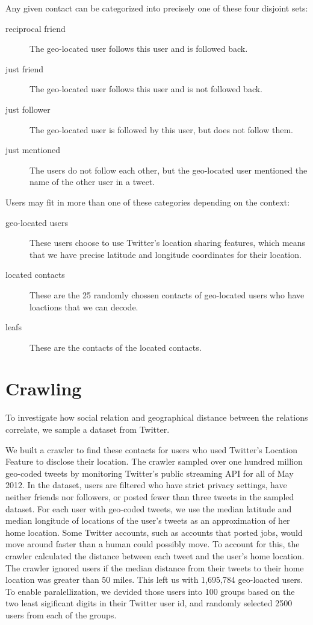 Any given contact can be categorized into precisely one of these four disjoint
sets:
\begin{description}
\item[reciprocal friend] The geo-located user follows this user and is followed
    back.
\item[just friend] The geo-located user follows this user and is not followed
    back.
\item[just follower] The geo-located user is followed by this user, but does
    not follow them.
\item[just mentioned] The users do not follow each other, but the geo-located
    user mentioned the name of the other user in a tweet.
\end{description}

Users may fit in more than one of these categories depending on the context:

\begin{description}
\item[geo-located users] These users choose to use Twitter's location sharing
    features, which means that we have precise latitude and longitude
    coordinates for their location.
\item[located contacts] These are the 25 randomly chossen contacts of
    geo-located users who have loactions that we can decode.
\item[leafs] These are the contacts of the located contacts.
\end{description}

\section{Crawling}
To investigate how social relation and geographical distance between the
relations correlate, we sample a dataset from Twitter.

We built a crawler to find these contacts for users who used Twitter's Location
Feature to disclose their location.
The crawler sampled over one hundred million geo-coded tweets by monitoring
Twitter's public streaming API for all of May 2012.
In the dataset, users are filtered who have strict privacy settings, have
neither friends nor followers, or posted fewer than three tweets in the sampled
dataset.
For each user with geo-coded tweets, we use the median latitude and median
longitude of locations of the user's tweets as an approximation of her home
location.
Some Twitter accounts, such as accounts that posted jobs, would
move around faster than a human could possibly move.
To account for this, the crawler calculated the distance between each tweet and
the user's home location.
The crawler ignored users if the median distance from their tweets to their
home location was greater than 50 miles.
This left us with 1,695,784 geo-loacted users.
To enable paralellization, we devided those users into 100 groups based on
the two least sigificant digits in their Twitter user id, and randomly selected
2500 users from each of the groups.

